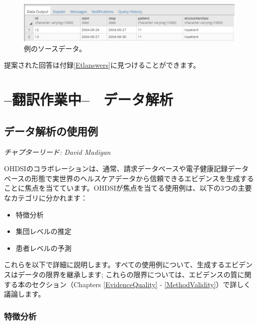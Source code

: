 \documentclass[
  11pt]{book}
\providecommand{\tightlist}{%
  \setlength{\itemsep}{0pt}\setlength{\parskip}{0pt}}
\theoremstyle{definition}
\theoremstyle{definition}
\theoremstyle{definition}
\theoremstyle{definition}
\theoremstyle{remark}
\begin{document}
\begin{figure}

{\centering \includegraphics[width=1\linewidth]{images/ExtractTransformLoad/exerciseSourceData} 

}

\caption{例のソースデータ。}\label{fig:exerciseSourceData}
\end{figure}

提案された回答は付録\ref{Etlanswers}に見つけることができます。

\part{--翻訳作業中--　データ解析}\label{part-ux7ffbux8a33ux4f5cux696dux4e2d-ux30c7ux30fcux30bfux89e3ux6790}

\chapter{データ解析の使用例}\label{DataAnalyticsUseCases}

\emph{チャプターリード: David Madigan}

OHDSIのコラボレーションは、通常、請求データベースや電子健康記録データベースの形態で実世界のヘルスケアデータから信頼できるエビデンスを生成することに焦点を当てています。OHDSIが焦点を当てる使用例は、以下の3つの主要なカテゴリに分かれます：

\begin{itemize}
\tightlist
\item
  特徴分析
\item
  集団レベルの推定
\item
  患者レベルの予測
\end{itemize}

これらを以下で詳細に説明します。すべての使用例について、生成するエビデンスはデータの限界を継承します; これらの限界については、エビデンスの質に関する本のセクション（Chapters \ref{EvidenceQuality} - \ref{MethodValidity}）で詳しく議論します。

\section{特徴分析}\label{ux7279ux5fb4ux5206ux6790}
\end{document}
